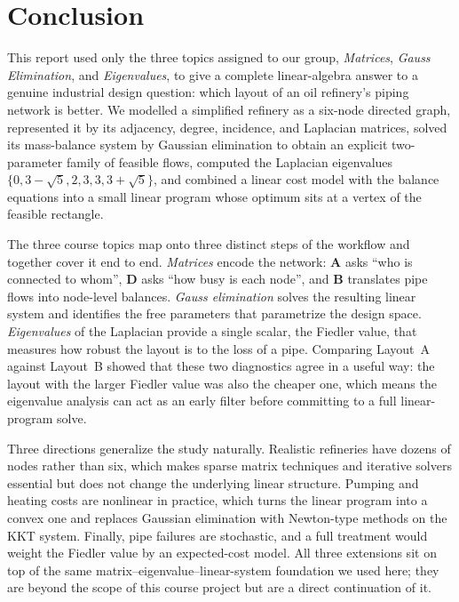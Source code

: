 \documentclass[11pt,a4paper]{article}
\newcommand{\mat}[1]{\mathbf{#1}}
\begin{document}
\section{Conclusion}
\label{sec:conclusion}

This report used only the three topics assigned to our group,
\emph{Matrices}, \emph{Gauss Elimination}, and \emph{Eigenvalues}, to
give a complete linear-algebra answer to a genuine industrial design
question: which layout of an oil refinery's piping network is better.
We modelled a simplified refinery as a six-node directed graph,
represented it by its adjacency, degree, incidence, and Laplacian
matrices, solved its mass-balance system by Gaussian elimination to
obtain an explicit two-parameter family of feasible flows, computed
the Laplacian eigenvalues $\{0, 3-\sqrt{5}, 2, 3, 3, 3+\sqrt{5}\}$,
and combined a linear cost model with the balance equations into a
small linear program whose optimum sits at a vertex of the feasible
rectangle.

The three course topics map onto three distinct steps of the
workflow and together cover it end to end. \emph{Matrices} encode the
network: $\mat{A}$ asks ``who is connected to whom'', $\mat{D}$ asks
``how busy is each node'', and $\mat{B}$ translates pipe flows into
node-level balances. \emph{Gauss elimination} solves the resulting
linear system and identifies the free parameters that parametrize the
design space. \emph{Eigenvalues} of the Laplacian provide a single
scalar, the Fiedler value, that measures how robust the layout is to
the loss of a pipe. Comparing Layout~A against Layout~B showed that
these two diagnostics agree in a useful way: the layout with the
larger Fiedler value was also the cheaper one, which means the
eigenvalue analysis can act as an early filter before committing to a
full linear-program solve.

Three directions generalize the study naturally. Realistic refineries
have dozens of nodes rather than six, which makes sparse matrix
techniques and iterative solvers essential but does not change the
underlying linear structure. Pumping and heating costs are nonlinear
in practice, which turns the linear program into a convex one and
replaces Gaussian elimination with Newton-type methods on the KKT
system. Finally, pipe failures are stochastic, and a full treatment
would weight the Fiedler value by an expected-cost model. All three
extensions sit on top of the same matrix--eigenvalue--linear-system
foundation we used here; they are beyond the scope of this course
project but are a direct continuation of it.
\end{document}
